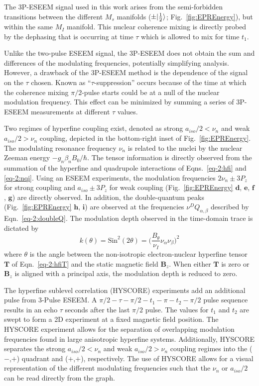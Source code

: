 The 3P-ESEEM signal used in this work arises from the semi-forbidden transitions between the different $M_s$ manifolds ($\pm \lvert\frac{1}{2}\rangle$; Fig.~\ref{fig:EPREnergy}), but within the same $M_I$ manifold. This nuclear coherence mixing is directly probed by the dephasing that is occurring at time $\tau$ which is allowed to mix for time $t_1$. 

Unlike the two-pulse ESEEM signal, the 3P-ESEEM does not obtain the sum and differences of the modulating frequencies, potentially simplifying analysis. However, a drawback of the 3P-ESEEM method is the dependence of the signal on the $\tau$ chosen. Known as ``$\tau$-suppression'' occurs because of the time at which the coherence mixing $\pi/2$-pulse starts could be at a null of the nuclear modulation frequency. \cite{schweiger2001principles} This effect can be minimized by summing a series of 3P-ESEEM measurements at different $\tau$ values.

Two regimes of hyperfine coupling exist, denoted as strong $a_{iso}/2 < \nu_n$ and weak $a_{iso}/2 > \nu_n$ coupling, depicted in the bottom-right inset of Fig.~\ref{fig:EPREnergy}. The modulating resonance frequency $\nu_n$ is related to the nuclei by the nuclear Zeeman energy $-g_n \beta_n B_0/\hbar$. The tensor information is directly observed from the summation of the hyperfine and quadrupole interactions of Eqns.~\ref{eq-2:hfi} and \ref{eq-2:nqi}. Using an ESEEM experiments, the modulation frequencies $2\nu_n \pm 3P_z$ for strong coupling and $a_{iso} \pm 3P_z$ for weak coupling (Fig.~\ref{fig:EPREnergy} $\mathbf{d}$, $\mathbf{e}$, $\mathbf{f}$, $\mathbf{g}$) are directly observed. In addition, the double-quantum peaks (Fig.~\ref{fig:EPREnergy} $\mathbf{h}$, $\mathbf{i}$) are observed at the frequencies $\nu^DQ_{\alpha,\beta}$ described by Eqn.~\ref{eq-2:doubleQ}. The modulation depth observed in the time-domain trace is dictated by
\begin{equation}
    k(\theta) = \text{Sin}^2(2\theta) = \bigg(\frac{B_\theta}{\nu_I}{\nu_\alpha \nu_\beta}\bigg)^2
\end{equation}
where $\theta$ is the angle between the non-isotropic electron-nuclear hyperfine tensor $\mathbf{T}$ of Eqn.~\ref{eq-2:hfiT} and the static magnetic field $\mathbf{B}_z$. When either $\mathbf{T}$ is zero or $\mathbf{B}_z$ is aligned with a principal axis, the modulation depth is reduced to zero.

The hyperfine sublevel correlation (HYSCORE) experiments add an additional pulse from 3-Pulse ESEEM. A  ${\pi/2\!-\!\tau\!-\!\pi/2\!-\!t_1\!-\!\pi\!-\!t_2\!-\!\pi/2}$ pulse sequence results in an echo $\tau$ seconds after the last $\pi/2$ pulse. The values for $t_1$ and $t_2$ are swept to form a 2D experiment at a fixed magnetic field position. The HYSCORE experiment allows for the separation of overlapping modulation frequencies found in large anisotropic hyperfine systems. Additionally, HYSCORE separates the strong $a_{iso}/2 < \nu_n$ and weak $a_{iso}/2 > \nu_n$ coupling regimes into the ($-$,$+$) quadrant and ($+$,$+$), respectively. The use of HYSCORE allows for a visual representation of the different modulating frequencies such that the $\nu_n$ or $a_{iso}/2$ can be read directly from the graph. 

